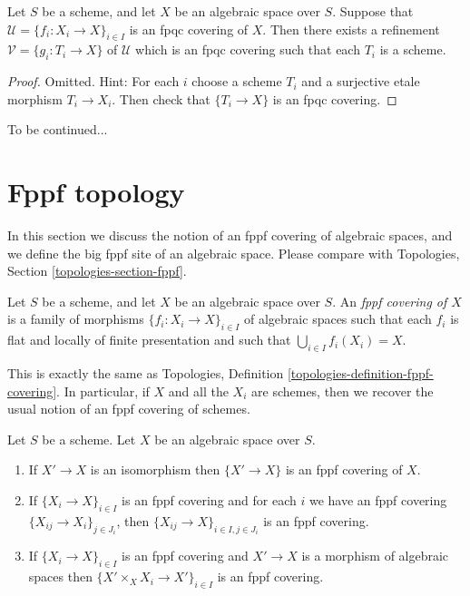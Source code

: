 \begin{lemma}
\label{lemma-refine-fpqc-schemes}
Let $S$ be a scheme, and let $X$ be an algebraic space over $S$.
Suppose that $\mathcal{U} = \{f_i : X_i \to X\}_{i \in I}$ is an
fpqc covering of $X$. Then there exists a refinement 
$\mathcal{V} = \{g_i : T_i \to X\}$ of $\mathcal{U}$ which is an
fpqc covering such that each $T_i$ is a scheme.
\end{lemma}

\begin{proof}
Omitted. Hint: For each $i$ choose a scheme $T_i$ and a surjective etale
morphism $T_i \to X_i$. Then check that $\{T_i \to X\}$ is an fpqc covering.
\end{proof}

\noindent
To be continued...




\section{Fppf topology}
\label{section-fppf}

\noindent
In this section we discuss the notion of an fppf covering of algebraic spaces,
and we define the big fppf site of an algebraic space. Please compare with
Topologies, Section \ref{topologies-section-fppf}.

\begin{definition}
\label{definition-fppf-covering}
Let $S$ be a scheme, and let $X$ be an algebraic space over $S$.
An {\it fppf covering of $X$} is a family of morphisms
$\{f_i : X_i \to X\}_{i \in I}$ of algebraic spaces
such that each $f_i$ is flat and locally of finite presentation
and such that $\bigcup_{i \in I} f_i(X_i) = X$.
\end{definition}

\noindent
This is exactly the same as
Topologies, Definition \ref{topologies-definition-fppf-covering}.
In particular, if $X$ and all the $X_i$ are schemes, then we recover the usual
notion of an fppf covering of schemes.

\begin{lemma}
\label{lemma-fppf}
Let $S$ be a scheme.
Let $X$ be an algebraic space over $S$.
\begin{enumerate}
\item If $X' \to X$ is an isomorphism then $\{X' \to X\}$
is an fppf covering of $X$.
\item If $\{X_i \to X\}_{i\in I}$ is an fppf covering and for each
$i$ we have an fppf covering $\{X_{ij} \to X_i\}_{j\in J_i}$, then
$\{X_{ij} \to X\}_{i \in I, j\in J_i}$ is an fppf covering.
\item If $\{X_i \to X\}_{i\in I}$ is an fppf covering
and $X' \to X$ is a morphism of algebraic spaces then
$\{X' \times_X X_i \to X'\}_{i\in I}$ is an fppf covering.
\end{enumerate}
\end{lemma}

